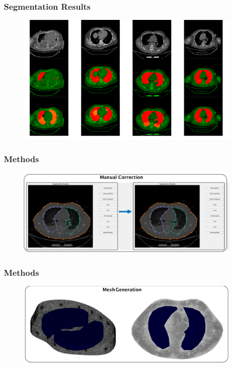 \documentclass[10pt,    %
    english,            %
    xcolor=table,       %
    envcountsect,        %
    aspectratio=1610
]{beamer}
\begin{document}
\begin{frame}
	\frametitle{Segmentation Results}    
	\begin{figure}[H]
		\centering
		\includegraphics[width=\textwidth]{segment_results.png}
	\end{figure}
\end{frame}

\begin{frame}
	\frametitle{Methods}    
	\begin{figure}[H]
		\centering
		\includegraphics[width=\textwidth]{lung_segmentation_methods_b.pdf}
	\end{figure}
\end{frame}

\begin{frame}
	\frametitle{Methods}    
	\begin{figure}[H]
		\centering
		\includegraphics[width=\textwidth]{lung_segmentation_methods_c.pdf}
	\end{figure}
\end{frame}
\end{document}
